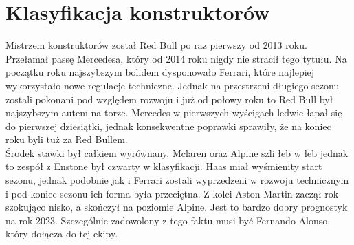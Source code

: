 \documentclass[12pt]{article}
\begin{document}
\newpage
\section{Klasyfikacja konstruktorów}
Mistrzem konstruktorów został Red Bull po raz pierwszy od 2013 roku. Przełamał passę Mercedesa, który od 2014 roku nigdy nie stracił tego tytułu. Na początku roku najszybszym bolidem dysponowało Ferrari, które najlepiej wykorzystało nowe regulacje techniczne. Jednak na przestrzeni długiego sezonu zostali pokonani pod względem rozwoju i już od połowy roku to Red Bull był najszybszym autem na torze. Mercedes w pierwszych wyścigach ledwie łapał się do pierwszej dziesiątki, jednak konsekwentne poprawki sprawiły, że na koniec roku byli tuż za Red Bullem.\\

Środek stawki był całkiem wyrównany, Mclaren oraz Alpine szli łeb w łeb jednak to zespół z Enstone był czwarty w klasyfikacji. Haas miał wyśmienity start sezonu, jednak podobnie jak i Ferrari zostali wyprzedzeni w rozwoju technicznym i pod koniec sezonu ich forma była przeciętna. Z kolei Aston Martin zaczął rok szokująco nisko, a skończył na poziomie Alpine. Jest to bardzo dobry prognostyk na rok 2023. Szczególnie zadowolony z tego faktu musi być Fernando Alonso, który dołącza do tej ekipy.\\
\end{document}
